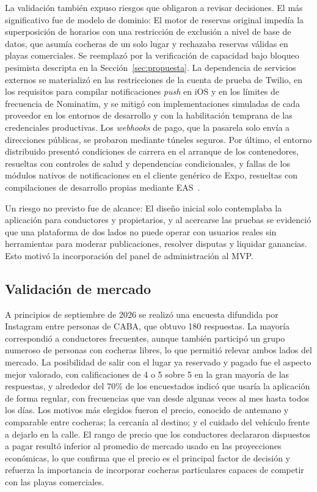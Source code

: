 \documentclass[conference,a4paper]{IEEEtran}
\begin{document}
La validación también expuso riesgos que obligaron a revisar decisiones. El más significativo fue de modelo de dominio: El motor de reservas original impedía la superposición de horarios con una restricción de exclusión a nivel de base de datos, que asumía cocheras de un solo lugar y rechazaba reservas válidas en playas comerciales. Se reemplazó por la verificación de capacidad bajo bloqueo pesimista descripta en la Sección~\ref{sec:propuesta}. La dependencia de servicios externos se materializó en las restricciones de la cuenta de prueba de Twilio, en los requisitos para compilar notificaciones \textit{push} en iOS y en los límites de frecuencia de Nominatim, y se mitigó con implementaciones simuladas de cada proveedor en los entornos de desarrollo y con la habilitación temprana de las credenciales productivas. Los \textit{webhooks} de pago, que la pasarela solo envía a direcciones públicas, se probaron mediante túneles seguros. Por último, el entorno distribuido presentó condiciones de carrera en el arranque de los contenedores, resueltas con controles de salud y dependencias condicionales, y fallas de los módulos nativos de notificaciones en el cliente genérico de Expo, resueltas con compilaciones de desarrollo propias mediante EAS~\cite{eas}.

Un riesgo no previsto fue de alcance: El diseño inicial solo contemplaba la aplicación para conductores y propietarios, y al acercarse las pruebas se evidenció que una plataforma de dos lados no puede operar con usuarios reales sin herramientas para moderar publicaciones, resolver disputas y liquidar ganancias. Esto motivó la incorporación del panel de administración al MVP.

\subsection{Validación de mercado}

A principios de septiembre de 2026 se realizó una encuesta difundida por Instagram entre personas de CABA, que obtuvo 180 respuestas. La mayoría correspondió a conductores frecuentes, aunque también participó un grupo numeroso de personas con cocheras libres, lo que permitió relevar ambos lados del mercado. La posibilidad de salir con el lugar ya reservado y pagado fue el aspecto mejor valorado, con calificaciones de 4 o 5 sobre 5 en la gran mayoría de las respuestas, y alrededor del 70\% de los encuestados indicó que usaría la aplicación de forma regular, con frecuencias que van desde algunas veces al mes hasta todos los días. Los motivos más elegidos fueron el precio, conocido de antemano y comparable entre cocheras; la cercanía al destino; y el cuidado del vehículo frente a dejarlo en la calle. El rango de precio que los conductores declararon dispuestos a pagar resultó inferior al promedio de mercado usado en las proyecciones económicas, lo que confirma que el precio es el principal factor de decisión y refuerza la importancia de incorporar cocheras particulares capaces de competir con las playas comerciales.
\end{document}
